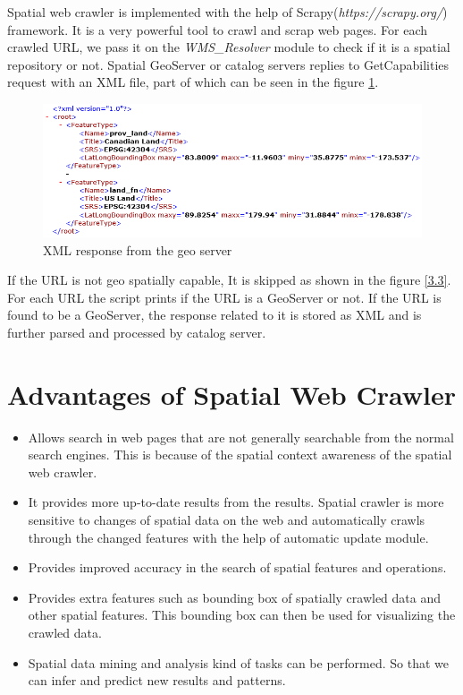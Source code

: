\par
Spatial web crawler is implemented with the help of Scrapy(\textit{https://scrapy.org/}) framework. It is a very powerful tool to crawl and scrap web pages. For each crawled URL, we pass it on the \textit{WMS\_Resolver} module to check if it is a spatial repository or not. Spatial GeoServer or catalog servers replies to GetCapabilities request with an XML file, part of which can be seen in the figure \ref{3.2}.
\newline
\begin{figure}[h]
\includegraphics[width=\textwidth]{1}
\begin{center}
\caption{XML response from the geo server}
\label{3.2}
\end{center}  
\end{figure}
\par
If the URL is not geo spatially capable, It is skipped as shown in the figure \ref{3.3}. For each URL the script prints if the URL is a GeoServer or not. If the URL is found to be a GeoServer, the response related to it is stored as XML and is further parsed and processed by catalog server.

\section{Advantages of Spatial Web Crawler}

\begin{itemize}
\item  Allows search in web pages that are not generally searchable from the normal search
engines. This is because of the spatial context awareness of the spatial web crawler.
\item It provides more up-to-date results from the results. Spatial crawler is more sensitive to
changes of spatial data on the web and automatically crawls through the changed
features with the help of automatic update module.
\item Provides improved accuracy in the search of spatial features and operations.
\item Provides extra features such as bounding box of spatially crawled data and other spatial
features. This bounding box can then be used for visualizing the crawled data.
\item Spatial data mining and analysis kind of tasks can be performed. So that we can infer and predict new results and patterns.
\end{itemize}